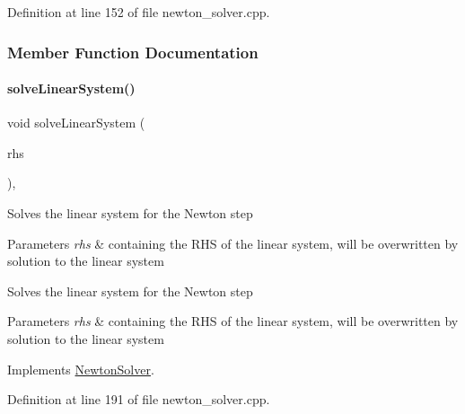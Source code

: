 Definition at line 152 of file newton\+\_\+solver.\+cpp.



\subsubsection{Member Function Documentation}
\mbox{\label{classamici_1_1_newton_solver_dense_aa4a6695d71f00ec1b46e94b33e55660f}} 
\paragraph{\texorpdfstring{solve\+Linear\+System()}{solveLinearSystem()}}
{\footnotesize\ttfamily void solve\+Linear\+System (\begin{DoxyParamCaption}\item[{\mbox{\hyperlink{classamici_1_1_ami_vector}{Ami\+Vector}} $\ast$}]{rhs }\end{DoxyParamCaption})\hspace{0.3cm}{\ttfamily [override]}, {\ttfamily [virtual]}}

Solves the linear system for the Newton step


\begin{DoxyParams}{Parameters}
{\em rhs} & containing the R\+HS of the linear system, will be overwritten by solution to the linear system \\
\hline
\end{DoxyParams}
Solves the linear system for the Newton step


\begin{DoxyParams}{Parameters}
{\em rhs} & containing the R\+HS of the linear system, will be overwritten by solution to the linear system\\
\hline
\end{DoxyParams}


Implements \mbox{\hyperlink{classamici_1_1_newton_solver_a761a5dc9e8cc7adfd4a392421df17c3d}{Newton\+Solver}}.



Definition at line 191 of file newton\+\_\+solver.\+cpp.

